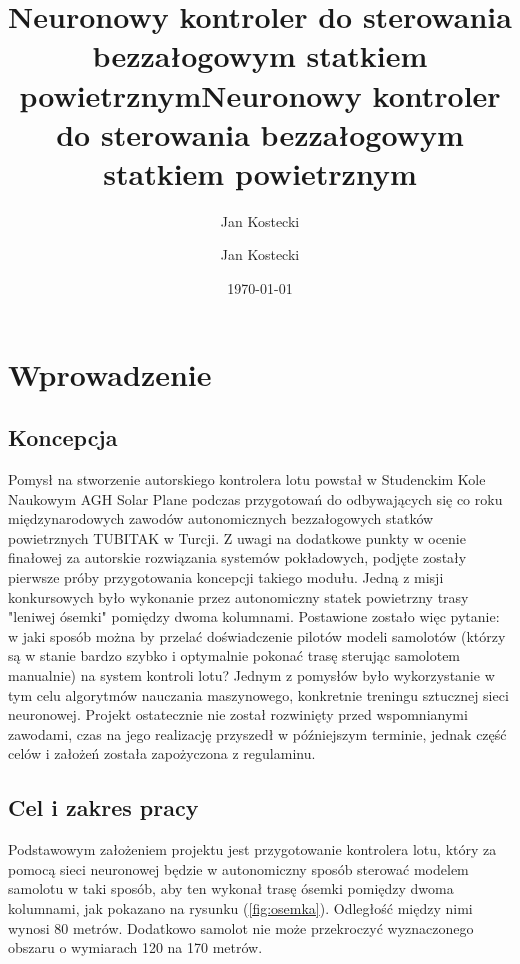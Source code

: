 \documentclass[12pt, a4paper]{article}
\title{Neuronowy kontroler do sterowania bezzałogowym statkiem powietrznym}
\author{Jan Kostecki}
\title{Neuronowy kontroler do sterowania bezzałogowym statkiem powietrznym}
\author{Jan Kostecki}
\date{\today}
\let\oldref\ref
\renewcommand{\ref}[1]{(\oldref{#1})}
\begin{document}
\onehalfspacing
\maketitle
\newpage
\tableofcontents

\clearpage

\section{Wprowadzenie}
\subsection{Koncepcja}

Pomysł na stworzenie autorskiego kontrolera lotu powstał w Studenckim Kole Naukowym AGH Solar Plane podczas przygotowań do odbywających się co roku międzynarodowych zawodów autonomicznych bezzałogowych statków powietrznych TUBITAK w Turcji. Z uwagi na dodatkowe punkty w ocenie finałowej za autorskie rozwiązania systemów pokładowych, podjęte zostały pierwsze próby przygotowania koncepcji takiego modułu. Jedną z misji konkursowych było wykonanie przez autonomiczny statek powietrzny trasy "leniwej ósemki" pomiędzy dwoma kolumnami. Postawione zostało więc pytanie: w jaki sposób można by przelać doświadczenie pilotów modeli samolotów (którzy są w stanie bardzo szybko i optymalnie pokonać trasę sterując samolotem manualnie) na system kontroli lotu? Jednym z pomysłów było wykorzystanie w tym celu algorytmów nauczania maszynowego, konkretnie treningu sztucznej sieci neuronowej. Projekt ostatecznie nie został rozwinięty przed wspomnianymi zawodami, czas na jego realizację przyszedł w późniejszym terminie, jednak część celów i założeń została zapożyczona z regulaminu.

\subsection{Cel i zakres pracy}
Podstawowym założeniem projektu jest przygotowanie kontrolera lotu, który za pomocą sieci neuronowej będzie w autonomiczny sposób sterować modelem samolotu w taki sposób, aby ten wykonał trasę ósemki pomiędzy dwoma kolumnami, jak pokazano na rysunku \ref{fig:osemka}. Odległość między nimi wynosi 80 metrów. Dodatkowo samolot nie może przekroczyć wyznaczonego obszaru o wymiarach 120 na 170 metrów.
\end{document}
